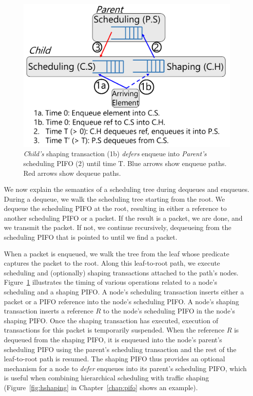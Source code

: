 \begin{figure}[!t]
  \centering
  \includegraphics[width=0.6\columnwidth]{pifo_shaping_semantics.pdf}
  \caption{\textit{Child's} shaping transaction (1b) {\em defers} enqueue
  into \textit{Parent's} scheduling PIFO (2) until time T.  Blue arrows
  show enqueue paths. Red arrows show dequeue paths.  }
  \label{fig:shaping_timing}
\end{figure}

We now explain the semantics of a scheduling tree during dequeues and enqueues.
During a dequeue, we walk the scheduling tree starting from the root. We
dequeue the scheduling PIFO at the root, resulting in either a reference to
another scheduling PIFO or a packet. If the result is a packet, we are done,
and we transmit the packet. If not, we continue recursively, dequeueing from
the scheduling PIFO that is pointed to until we find a packet.

When a packet is enqueued, we walk the tree from the leaf whose predicate
captures the packet to the root. Along this leaf-to-root path, we execute
scheduling and (optionally) shaping transactions attached to the path's nodes.
Figure~\ref{fig:shaping_timing} illustrates the timing of various operations
related to a node's scheduling and a shaping PIFO. A node's scheduling
transaction inserts either a packet or a PIFO reference into the node's
scheduling PIFO. A node's shaping transaction inserts a reference $R$ to the
node's scheduling PIFO in the node's shaping PIFO. Once the shaping transaction
has executed, execution of transactions for this packet is temporarily
suspended.  When the reference $R$ is dequeued from the shaping PIFO, it is
enqueued into the node's parent's scheduling PIFO using the parent's scheduling
transaction and the rest of the leaf-to-root path is resumed.  The shaping PIFO
thus provides an optional mechanism for a node to {\em defer} enqueues into its
parent's scheduling PIFO, which is useful when combining hierarchical
scheduling with traffic shaping (Figure~\ref{fig:hshaping} in
Chapter~\ref{chap:pifo} shows an example).

